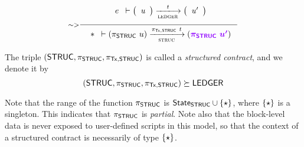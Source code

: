  \begin{equation}
    \inference[$\sim >$]
    {
      \\~\\
      {
        \begin{array}{c}
          e\\
        \end{array}
      }
      \vdash
      {
        \left(
          \begin{array}{r}
            \var{u} \\
          \end{array}
        \right)
      }
      \trans{ledger}{\var{t}}
      {
        \left(
          \begin{array}{r}
            \var{u'} \\
          \end{array}
        \right)
      }
      \\~\\
    }
    {
      \begin{array}{r}
        * \\
      \end{array}
    \vdash
      (\pi_{\STRUC}~u)
      \trans{struc}{\pi_{\Tx,\STRUC}~t}
      (\varUpdate{\pi_{\STRUC}~u'})
    }
  \end{equation}

The triple $(\mathsf{STRUC}, \pi_{\mathsf{STRUC}}, \pi_{\mathsf{Tx},\mathsf{STRUC}})$ is called a \emph{structured
contract}, and we denote it by
\[(\mathsf{STRUC}, \pi_{\mathsf{STRUC}}, \pi_{\mathsf{Tx},\mathsf{STRUC}}) \succeq \mathsf{LEDGER}\]

Note that the range of the function $\pi_{\mathsf{STRUC}}$ is
$\mathsf{State}_{\mathsf{STRUC}} \cup \{\star\}$, where $\{\star\}$ is a
singleton. This indicates that $\pi_{\mathsf{STRUC}}$ is \emph{partial}. Note also that
the block-level data is never exposed to user-defined scripts in this model,
so that the context of a structured contract is necessarily of type $\{\star\}$.

